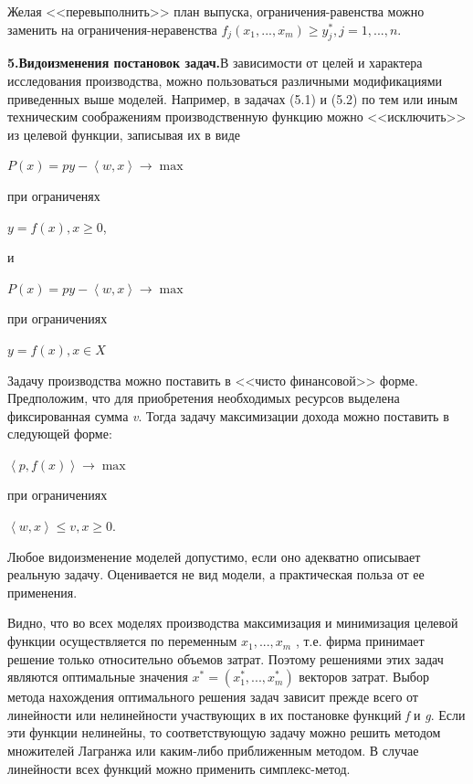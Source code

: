 \documentclass[12pt, 4paper]{book}
\begin{document}
{Желая <<перевыполнить>> план выпуска, ограничения-равенства можно заменить на ограничения-неравенства $f_j(x_1,...,x_m) \geq y_{j}^{*},j=1,...,n$. 
\par

\textbf{5.Видоизменения постановок задач.}В зависимости от целей и характера исследования производства, можно пользоваться различными модификациями приведенных выше моделей. Например, в задачах (5.1) и (5.2) по тем или иным техническим соображениям производственную функцию можно <<исключить>> из целевой функции, записывая их в виде 
\begin{center}
$P(x) = py - \left\langle w,x \right\rangle \rightarrow \max$
\end{center}
\begin{center}
при ограниченях
\end{center}
\begin{center}
$y=f(x), x \geq 0$,
\end{center}
\begin{center}
и
\end{center}
\begin{center}
$P(x) = py - \left\langle w,x \right\rangle \rightarrow \max$
\end{center}
\begin{center}
при ограничениях
\end{center}
\begin{center}
$y=f(x),x \in X$
\end{center}
Задачу производства можно поставить в <<чисто финансовой>> форме. Предположим, что для приобретения необходимых ресурсов выделена фиксированная сумма \textit{v}. Тогда задачу максимизации дохода можно поставить в следующей форме: 
\begin{center}
$\left\langle  p,f(x)\right\rangle \rightarrow \max$
\end{center}
\begin{center}
при ограничениях
\end{center}
\begin{center}
$\left\langle w,x \right\rangle \leq v, x \geq 0$.
\end{center}
\par

Любое видоизменение моделей допустимо, если оно адекватно описывает реальную задачу. Оценивается не вид модели, а практическая польза от ее применения. 
\par

Видно, что во всех моделях производства максимизация и минимизация целевой функции осуществляется по переменным $x_1,...,x_m$ , т.е. фирма принимает решение только относительно объемов затрат. Поэтому решениями этих задач являются оптимальные значения $x^{*}= (x_{1}^{*},...,x_{m}^{*})$ векторов затрат. Выбор метода нахождения оптимального решения задач зависит прежде всего от линейности или нелинейности участвующих в их постановке функций \textit{f} и \textit{g}. Если эти функции нелинейны, то соответствующую задачу можно решить методом множителей Лагранжа или каким-либо приближенным методом. В случае линейности всех функций можно применить симплекс-метод. 
\par

}
\end{document}
